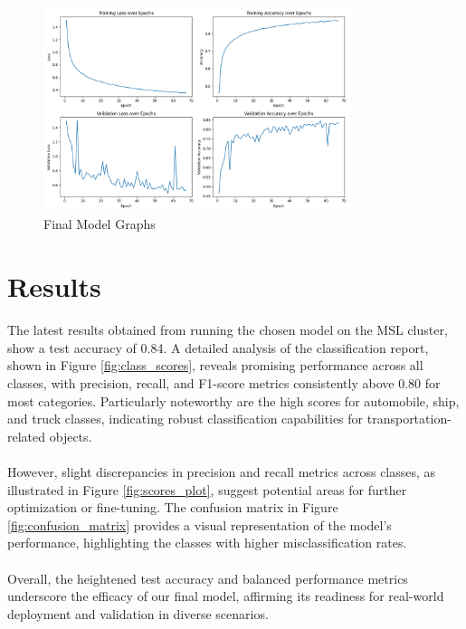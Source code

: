 \documentclass{article}
\begin{document}
\begin{figure}[H]
\centering
\includegraphics[width=0.8\textwidth]{finalModelGraphs.png}
\caption{Final Model Graphs}
\label{fig:finalModelGraphs}
\end{figure}

\section{Results}

The latest results obtained from running the chosen model on the MSL cluster, show a test accuracy of 0.84. A detailed analysis of the classification report, shown in Figure \ref{fig:class_scores}, reveals promising performance across all classes, with precision, recall, and F1-score metrics consistently above 0.80 for most categories. Particularly noteworthy are the high scores for automobile, ship, and truck classes, indicating robust classification capabilities for transportation-related objects.
\\\\
However, slight discrepancies in precision and recall metrics across classes, as illustrated in Figure \ref{fig:scores_plot}, suggest potential areas for further optimization or fine-tuning. The confusion matrix in Figure \ref{fig:confusion_matrix} provides a visual representation of the model's performance, highlighting the classes with higher misclassification rates.
\\\\
Overall, the heightened test accuracy and balanced performance metrics underscore the efficacy of our final model, affirming its readiness for real-world deployment and validation in diverse scenarios.
\end{document}
